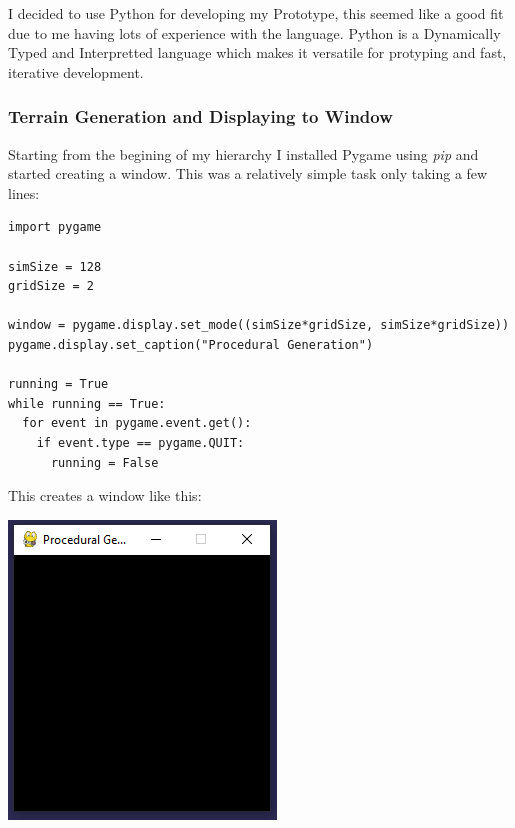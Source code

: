 \begin{flushleft}
            I decided to use Python for developing my Prototype, this seemed like a good fit due to me 
            having lots of experience with the language. Python is a Dynamically Typed and Interpretted 
            language which makes it versatile for protyping and fast, iterative development.
            
            \vspace{0.5cm}
            \subsubsection{Terrain Generation and Displaying to Window}
            \vspace{0.25cm}

            Starting from the begining of my hierarchy I installed Pygame using \textit{pip} and started creating a window.
            This was a relatively simple task only taking a few lines:
            \vspace{0.5cm}

            \normalsize
            \begin{verbatim}
import pygame

simSize = 128
gridSize = 2

window = pygame.display.set_mode((simSize*gridSize, simSize*gridSize))
pygame.display.set_caption("Procedural Generation")

running = True
while running == True:
  for event in pygame.event.get():
    if event.type == pygame.QUIT:
      running = False
            \end{verbatim}

            \vspace{0.5cm}

            \large
            This creates a window like this: \\ 
            \vspace{0.5cm}
            \centerline{\includegraphics{Images/Prototype/CreateWindowExample.PNG}}


\end{flushleft}

